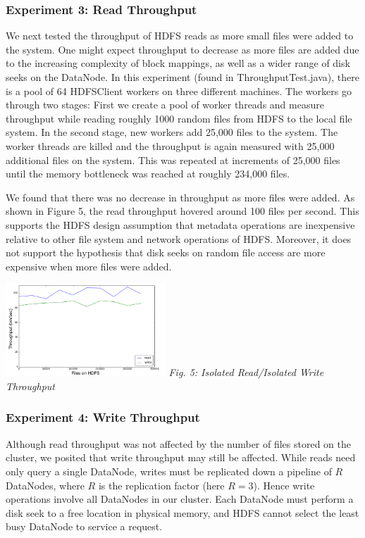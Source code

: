 \documentclass[11pt, a4paper]{article}
\begin{document}
\begin{multicols*}{2}
\subsubsection{Experiment 3: Read Throughput}\label{ReadThroughput}
We next tested the throughput of HDFS reads as more small files were added to the system. One might expect throughput to decrease as more files are added due to the increasing complexity of block mappings, as well as a wider range of disk seeks on the DataNode. In this experiment (found in ThroughputTest.java), there is a pool of 64 HDFSClient workers on three different machines. The workers go through two stages: First we create a pool of worker threads and measure throughput while reading roughly 1000 random files from HDFS to the local file system. In the second stage, new workers add 25,000 files to the system. The worker threads are killed and the throughput is again measured with 25,000 additional files on the system. This was repeated at increments of 25,000 files until the memory bottleneck was reached at roughly 234,000 files.

We found that there was no decrease in throughput as more files were added. As shown in Figure 5, the read throughput hovered around 100 files per second. This supports the HDFS design assumption that metadata operations are inexpensive relative to other file system and network operations of HDFS. Moreover, it does not support the hypothesis that disk seeks on random file access are more expensive when more files were added.

\begin{center}
	\includegraphics[keepaspectratio=true, width=0.45\textwidth]{ThroughputResults}
	\textit{Fig. 5: Isolated Read/Isolated Write Throughput}
\end{center}
\subsubsection{Experiment 4: Write Throughput}\label{WriteThroughput}
Although read throughput was not affected by the number of files stored on the cluster, we posited that write throughput may still be affected. While reads need only query a single DataNode, writes must be replicated down a pipeline of $R$ DataNodes, where $R$ is the replication factor (here $R = 3$). Hence write operations involve all DataNodes in our cluster. Each DataNode must perform a disk seek to a free location in physical memory, and HDFS cannot select the least busy DataNode to service a request.


\end{multicols*}
\end{document}
